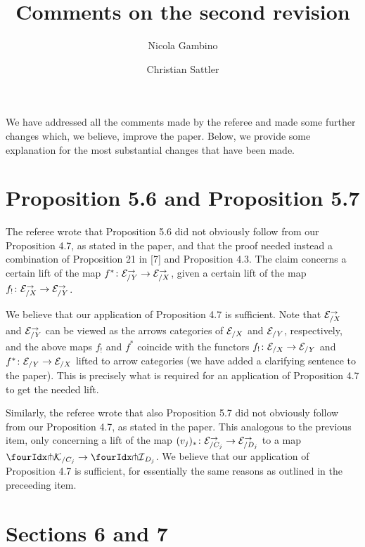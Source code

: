\documentclass[reqno,10pt,a4paper,oneside,draft]{amsart}
\begin{document}
\title{Comments on the second revision} 

\author{Nicola Gambino \and Christian Sattler} 

\maketitle

We have addressed all the comments made by the referee and made some further changes  which, we believe, improve the
paper. Below, we provide some explanation for the most substantial changes that have been made. 

\section*{Proposition 5.6 and Proposition 5.7}

The referee wrote that Proposition 5.6  did not obviously follow from our Proposition 4.7, as stated in the paper, and that the proof needed instead a combination of Proposition 21 in [7] and Proposition 4.3.
The claim concerns a certain lift of the map $f^* \co \cal{E}_{/Y}^\to \to \cal{E}_{/X}^\to$, given a certain lift of the map $f_! \co \cal{E}_{/X}^\to \to \cal{E}_{/Y}^\to$.

We believe that our application of Proposition 4.7 is sufficient.
Note that $\cal{E}_{/X}^\to$ and $\cal{E}_{/Y}^\to$ can be viewed as the arrows categories of $\cal{E}_{/X}$ and $\cal{E}_{/Y}$, respectively, and the above maps $f_!$ and $f^*$ coincide with the functors $f_! \co \cal{E}_{/X} \to \cal{E}_{/Y}$ and $f^* \co \cal{E}_{/Y} \to \cal{E}_{/X}$ lifted to arrow categories (we have added a clarifying sentence to the paper).
This is precisely what is required for an application of Proposition 4.7 to get the needed lift.

Similarly, the referee wrote that also Proposition 5.7  did not obviously follow from our Proposition 4.7, as stated in the paper.
This analogous to the previous item, only concerning a lift of the map $(v_j)_* \co \cal{E}_{/C_j}^\to \to \cal{E}_{/D_j}^\to$ to a map $\liftr{\cal{K}}_{/C_j} \to \liftr{\cal{I}}_{D_j}$.
We believe that our application of Proposition 4.7 is sufficient, for essentially the same reasons as outlined in the preceeding item.

\section*{Sections 6 and 7} 
\end{document}
